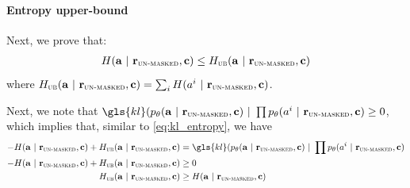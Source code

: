 \paragraph{Entropy upper-bound}
Next, we prove that:
\begin{align}
    H(\mathbf{a} ~\vert~ \mathbf{r}_{\textsc{un-masked}}, \mathbf{c}) \leq  H_\textsc{ub}(\mathbf{a} ~\vert~ \mathbf{r}_\textsc{un-masked}, \mathbf{c})
\end{align}
where $H_\textsc{ub}(\mathbf{a} ~\vert~ \mathbf{r}_\textsc{un-masked}, \mathbf{c}) = \sum_{i} H(a^i ~\vert~ \mathbf{r}_{\textsc{un-masked}}, \mathbf{c})$. 

Next, we note that $\gls{kl}(p_\theta(\mba \mid \mbr_{\textsc{un-masked}}, \mbc) \mid \prod p_\theta(a^i \mid \mbr_{\textsc{un-masked}}, \mbc) \geq 0$, which implies that, similar to \cref{eq:kl_entropy}, we have
\begin{align}\nonumber
   -H(\mba \mid \mbr_{\textsc{un-masked}}, \mbc) + H_\textsc{ub}(\mba \mid \mbr_\textsc{un-masked}, \mbc) &= \gls{kl}(p_\theta(\mba \mid \mbr_{\textsc{un-masked}}, \mbc) \mid \prod p_\theta(a^i \mid \mbr_{\textsc{un-masked}}, \mbc) \\
   -H(\mba \mid \mbr_{\textsc{un-masked}}, \mbc) + H_\textsc{ub}(\mba \mid \mbr_\textsc{un-masked}, \mbc)  &\geq 0 \\
   H_\textsc{ub}(\mba \mid \mbr_\textsc{un-masked}, \mbc) &\geq H(\mba \mid \mbr_{\textsc{un-masked}}, \mbc) 
\end{align}
